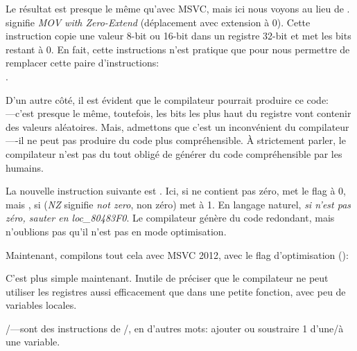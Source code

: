 \label{movzx}

Le résultat est presque le même qu'avec MSVC, mais ici nous voyons \MOVZX au lieu
de \MOVSX.
\MOVZX signifie \emph{MOV with Zero-Extend} (déplacement avec extension à 0).
Cette instruction copie une valeur 8-bit ou 16-bit dans un registre 32-bit et met
les bits restant à 0.
En fait, cette instructions n'est pratique que pour nous permettre de remplacer cette
paire d'instructions:\\
.

D'un autre côté, il est évident que le compilateur pourrait produire ce code: \\
---c'est presque le même, toutefois, les
bits les plus haut du registre \EAX vont contenir des valeurs aléatoires.
Mais, admettons que c'est un inconvénient du compilateur----il ne peut pas produire
du code plus compréhensible. À strictement parler, le compilateur n'est pas du tout
obligé de générer du code compréhensible par les humains.


La nouvelle instruction suivante est \SETNZ.
Ici, si \AL ne contient pas zéro,  met le flag \ZF à 0, mais \SETNZ,
si  (\emph{NZ} signifie \emph{not zero}, non zéro) met \AL à 1. En langage
naturel, \emph{si \AL n'est pas zéro, sauter en loc\_80483F0}. Le compilateur génère
du code redondant, mais n'oublions pas qu'il n'est pas en mode optimisation.

\label{strlen_MSVC_Ox}

Maintenant, compilons tout cela avec MSVC 2012, avec le flag d'optimisation (\Ox):



C'est plus simple maintenant. Inutile de préciser que le compilateur ne peut utiliser
les registres aussi efficacement que dans une petite fonction, avec peu de variables
locales.

\INC/\DEC---sont des instructions de /,
en d'autres mots: ajouter ou soustraire 1 d'une/à une variable.




